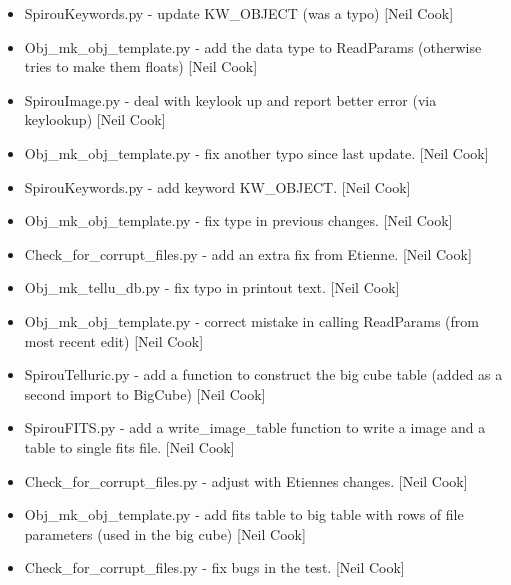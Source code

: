\documentclass[a4paper,10pt,english]{report}
\begin{document}
\begin{itemize}
\item {} 
SpirouKeywords.py - update KW\_OBJECT (was a typo) {[}Neil Cook{]}

\item {} 
Obj\_mk\_obj\_template.py - add the data type to ReadParams (otherwise
tries to make them floats) {[}Neil Cook{]}

\item {} 
SpirouImage.py - deal with keylook up and report better error (via
keylookup) {[}Neil Cook{]}

\item {} 
Obj\_mk\_obj\_template.py - fix another typo since last update. {[}Neil
Cook{]}

\item {} 
SpirouKeywords.py - add keyword KW\_OBJECT. {[}Neil Cook{]}

\item {} 
Obj\_mk\_obj\_template.py - fix type in previous changes. {[}Neil Cook{]}

\item {} 
Check\_for\_corrupt\_files.py - add an extra fix from Etienne. {[}Neil
Cook{]}

\item {} 
Obj\_mk\_tellu\_db.py - fix typo in printout text. {[}Neil Cook{]}

\item {} 
Obj\_mk\_obj\_template.py - correct mistake in calling ReadParams (from
most recent edit) {[}Neil Cook{]}

\item {} 
SpirouTelluric.py - add a function to construct the big cube table
(added as a second import to BigCube) {[}Neil Cook{]}

\item {} 
SpirouFITS.py - add a write\_image\_table function to write a image and
a table to single fits file. {[}Neil Cook{]}

\item {} 
Check\_for\_corrupt\_files.py - adjust with Etiennes changes. {[}Neil Cook{]}

\item {} 
Obj\_mk\_obj\_template.py - add fits table to big table with rows of file
parameters (used in the big cube) {[}Neil Cook{]}

\item {} 
Check\_for\_corrupt\_files.py - fix bugs in the test. {[}Neil Cook{]}

\end{itemize}
\end{document}

